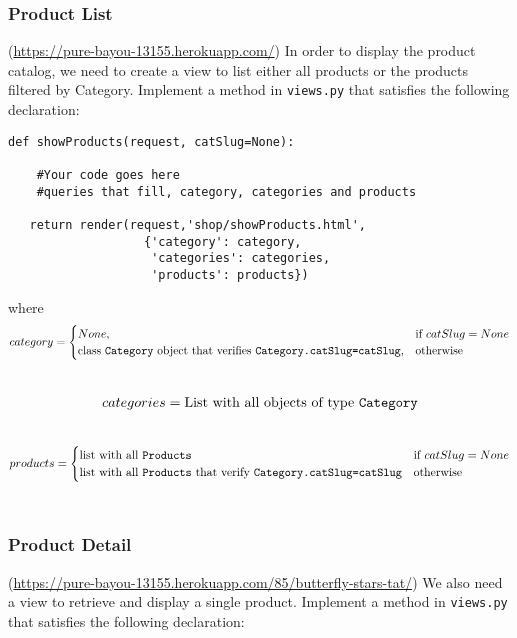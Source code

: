 \documentclass[12pt]{article} %
\newcommand{\herokuurl}[1]{\url{https://pure-bayou-13155.herokuapp.com/#1}}%
\newcommand{\views}{\texttt{views.py}}%
\begin{document}
\subsubsection{Product List}(\herokuurl{})
In order to display the product catalog, we need to create a view to list either all products or the products filtered by Category. Implement a method in  \views{} that satisfies the following declaration:

\begin{verbatim}
def showProducts(request, catSlug=None):
   
    #Your code goes here
    #queries that fill, category, categories and products
   
   return render(request,'shop/showProducts.html', 
                   {'category': category,
                    'categories': categories,
                    'products': products})

\end{verbatim}
where\\

\begin{equation}
    category=
   \begin{cases}
     None, & \text{if}\ catSlug=None \\
     \text{class \texttt{Category} object that verifies \texttt{Category.catSlug=catSlug}}, & 
     \text{otherwise}
   \end{cases}
\end{equation}\\
\begin{equation}
   categories = \text{List with all objects of type \texttt{Category}}
\end{equation}\\
\begin{equation}
   products=
   \begin{cases}
     \text{list with all \texttt{Products}} & \text{if}\ catSlug=None \\
     \text{list with all \texttt{Products} that verify \texttt{Category.catSlug=catSlug}} & \text{otherwise}
   \end{cases}
\end{equation}\\
  
\subsubsection{Product Detail} (\herokuurl{85/butterfly-stars-tat/})
We also need a view to retrieve and display a single product. Implement a method in  \views{} that satisfies the following declaration:
\end{document}
